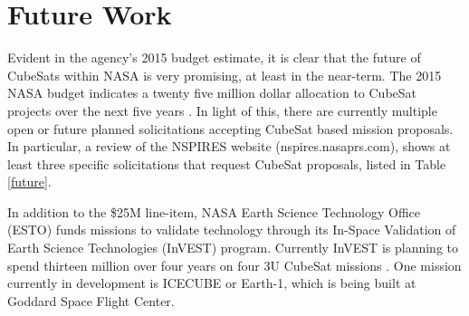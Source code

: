 \documentclass[11pt]{article}
\begin{document}
\section{Future Work}
Evident in the agency's 2015 budget estimate, it is clear that the future of CubeSats within NASA is very promising, at least in the near-term. The 2015 NASA budget indicates a twenty five million dollar allocation to CubeSat projects over the next five years \cite{budget}. In light of this, there are currently multiple open or future planned solicitations accepting CubeSat based mission proposals. In particular, a review of the NSPIRES website (nspires.nasaprs.com), shows at least three specific solicitations that request CubeSat proposals, listed in Table \ref{future}. 

In addition to the \$25M line-item, NASA Earth Science Technology Office (ESTO) funds missions to validate technology through its In-Space Validation of Earth Science Technologies (InVEST) program. Currently InVEST is planning to spend thirteen million over four years on four 3U CubeSat missions \cite{klumpar}. One mission currently in development is ICECUBE or Earth-1, which is being built at Goddard Space Flight Center. 
\end{document}
